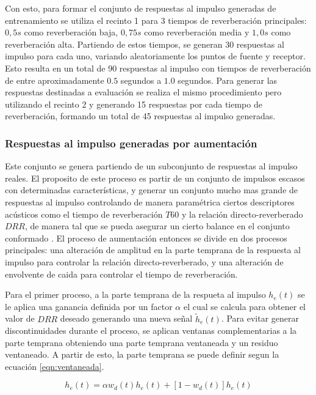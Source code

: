 Con esto, para formar el conjunto de respuestas al impulso generadas de entrenamiento se utiliza el recinto 1 para 3 tiempos de reverberación principales: $0,5 s$ como reverberación baja, $0,75 s$ como reverberación media y $1,0 s$ como reverberación alta. Partiendo de estos tiempos, se generan 30 respuestas al impulso para cada uno, variando aleatoriamente los puntos de fuente y receptor. Esto resulta en un total de 90 respuestas al impulso con tiempos de reverberación de entre aproximadamente $0.5$ segundos a $1.0$ segundos. Para generar las respuestas destinadas a evaluación se realiza el mismo procedimiento pero utilizando el recinto 2 y generando 15 respuestas por cada tiempo de reverberación, formando un total de 45 respuestas al impulso generadas. 

\subsubsection{Respuestas al impulso generadas por aumentación}
Este conjunto se genera partiendo de un subconjunto de respuestas al impulso reales. El proposito de este proceso es partir de un conjunto de impulsos escasos con determinadas características, y generar un conjunto mucho mas grande de respuestas al impulso controlando de manera paramétrica ciertos descriptores acústicos como el tiempo de reverberación $T60$ y la relación directo-reverberado $DRR$, de manera tal que se pueda asegurar un cierto balance en el conjunto conformado \cite{rir_aug}. El proceso de aumentación entonces se divide en dos procesos principales: una alteración de amplitud en la parte temprana de la respuesta al impulso para controlar la relación directo-reverberado, y una alteración de envolvente de caida para controlar el tiempo de reverberación.

Para el primer proceso, a la parte temprana de la respueta al impulso $h_{e}(t)$ se le aplica una ganancia definida por un factor $\alpha$ el cual se calcula para obtener el valor de $DRR$ deseado generando una nueva señal $\tilde{h}_{e}(t)$. Para evitar generar discontinuidades durante el proceso, se aplican ventanas complementarias a la parte temprana obteniendo una parte temprana ventaneada y un residuo ventaneado. A partir de esto, la parte temprana se puede definir segun la ecuación
\ref{eqn:ventaneada}.  

\begin{equation}
\label{eqn:ventaneada}
	h_{e}(t) = \alpha w_{d}(t)h_{e}(t) + [1-w_{d}(t)]h_{e}(t)
\end{equation} 

